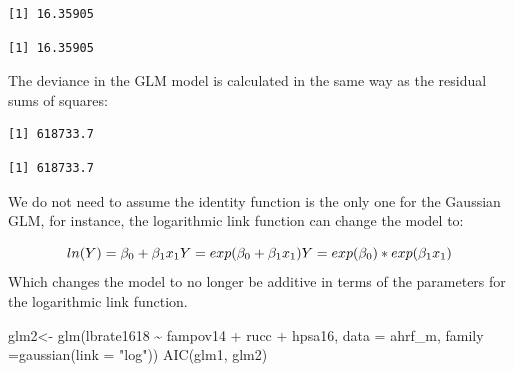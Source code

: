 \documentclass[
  letterpaper,
  DIV=11,
  numbers=noendperiod]{scrreprt}
\newenvironment{Shaded}{\begin{snugshade}}{\end{snugshade}}
\newcommand{\AttributeTok}[1]{\textcolor[rgb]{0.40,0.45,0.13}{#1}}
\newcommand{\DecValTok}[1]{\textcolor[rgb]{0.68,0.00,0.00}{#1}}
\newcommand{\FunctionTok}[1]{\textcolor[rgb]{0.28,0.35,0.67}{#1}}
\newcommand{\NormalTok}[1]{\textcolor[rgb]{0.00,0.23,0.31}{#1}}
\newcommand{\OtherTok}[1]{\textcolor[rgb]{0.00,0.23,0.31}{#1}}
\newcommand{\SpecialCharTok}[1]{\textcolor[rgb]{0.37,0.37,0.37}{#1}}
\newcommand{\StringTok}[1]{\textcolor[rgb]{0.13,0.47,0.30}{#1}}
\begin{document}
\begin{verbatim}
[1] 16.35905
\end{verbatim}

\begin{Shaded}
\end{Shaded}

\begin{verbatim}
[1] 16.35905
\end{verbatim}

The deviance in the GLM model is calculated in the same way as the
residual sums of squares:

\begin{Shaded}
\end{Shaded}

\begin{verbatim}
[1] 618733.7
\end{verbatim}

\begin{Shaded}
\end{Shaded}

\begin{verbatim}
[1] 618733.7
\end{verbatim}

We do not need to assume the identity function is the only one for the
Gaussian GLM, for instance, the logarithmic link function can change the
model to:

\[
ln(Y) = \beta_0 + \beta_1 x_1 \\
Y = exp(\beta_0 + \beta_1 x_1) \\
Y = exp(\beta_0) * exp(\beta_1 x_1)
\] Which changes the model to no longer be additive in terms of the
parameters for the logarithmic link function.

\begin{Shaded}
\begin{Highlighting}[]
\NormalTok{glm2}\OtherTok{\textless{}{-}} \FunctionTok{glm}\NormalTok{(lbrate1618 }\SpecialCharTok{\textasciitilde{}}\NormalTok{  fampov14 }\SpecialCharTok{+}\NormalTok{ rucc }\SpecialCharTok{+}\NormalTok{ hpsa16,}
          \AttributeTok{data =}\NormalTok{ ahrf\_m, }
          \AttributeTok{family =}\FunctionTok{gaussian}\NormalTok{(}\AttributeTok{link =} \StringTok{"log"}\NormalTok{))}
\FunctionTok{AIC}\NormalTok{(glm1, glm2)}
\end{Highlighting}
\end{Shaded}
\end{document}
